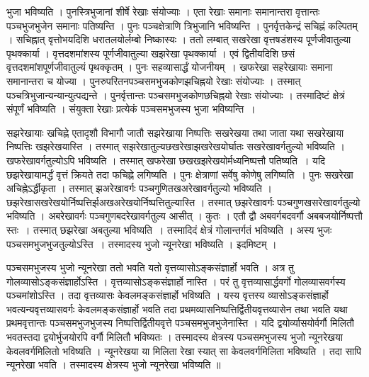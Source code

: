 \documentclass[11pt, openany]{book}
\begin{document}
\newpage
\noindent भुजा भविष्यति । पुनस्त्रिभुजानां शीर्षे रेखाः संयोज्याः । एता रेखाः समानाः समानान्तरा वृत्तान्तः पञ्चभुजभुजेन समानाः पतिष्यन्ति । पुनः पञ्चक्षेत्राणि त्रिभुजानि भविष्यन्ति । पुनर्वृत्तकेन्द्रं सचिह्नं कल्पितम् । सचिह्नात् वृत्तोभयदिशि धरातलयोर्लम्बो निष्कास्यः । ततो लम्बात् सखरेखा वृत्तषडंशस्य पूर्णजीवातुल्या पृथक्कार्या । वृत्तदशमांशस्य पूर्णजीवातुल्या खझरेखा पृथक्कार्या । एवं द्वितीयदिशि छसं वृत्तदशमांशपूर्णजीवातुल्यं पृथक्कृतम् । पुनः सहव्यासार्द्धं योजनीयम्~। खफरेखा सहरेखायाः समाना समानान्तरा च योज्या । पुनरुपरितनपञ्चसमभुजकोणझचिह्नयो रेखाः संयोज्याः । तस्मात् पञ्चत्रिभुजान्यन्यान्युत्पद्यन्ते । पुनर्वृत्तान्तः पञ्चसमभुजकोणछचिह्नयो रेखाः संयोज्याः । तस्मादिष्टं क्षेत्रं संपूर्णं भविष्यति । संयुक्ता
रेखाः प्रत्येकं पञ्चसमभुजस्य भुजा भविष्यन्ति~।\\
\vspace{10mm}


सझरेखायाः खचिह्ने एतादृशौ विभागौ जातौ सझरेखाया निष्पत्तिः सखरेखया तथा जाता यथा सखरेखाया निष्पत्तिः खझरेखयास्ति । तस्मात् सझरेखातुल्यछखरेखाझखरेखयोर्घातः सखरेखावर्गतुल्यो भविष्यति । खफरेखावर्गतुल्योऽपि भविष्यति । तस्मात् खफरेखा छखखझरेखयोर्मध्यनिष्पत्तौ पतिष्यति~। यदि छझरेखायामर्द्धं वृत्तं क्रियते तदा फचिह्ने लगिष्यति । पुनः क्षेत्राणां सर्वेषु कोणेषु लगिष्यति~। पुनः सखरेखा अचिह्नेऽर्द्धीकृता । तस्मात् झअरेखावर्गः पञ्चगुणितखअरेखावर्गतुल्यो भविष्यति । छझरेखासखरेखयोर्निष्पत्तिर्झअखअरेखयोर्निष्पत्तितुल्यास्ति । तस्मात् छझरेखावर्गः पञ्चगुणखसरेखावर्गतुल्यो भविष्यति । अबरेखावर्गः पञ्चगुणबदरेखावर्गतुल्य आसीत् । कुतः । एतौ द्वौ अबवर्गबदवर्गौ अबबजयोर्निष्पत्तौ स्तः~। तस्मात् छझरेखा अबतुल्या भविष्यति~। तस्मादिदं क्षेत्रं गोलान्तर्गतं भविष्यति । अस्य भुजः पञ्चसमभुजभुजतुल्योऽस्ति~। तस्मादस्य भुजो न्यूनरेखा भविष्यति । इदमिष्टम् ।

\newpage

पञ्चसमभुजस्य भुजो न्यूनरेखा ततो भवति यतो वृत्तव्यासोऽङ्कसंज्ञार्हो भवति । अत्र तु गोलव्यासोऽङ्कसंज्ञार्होऽस्ति । वृत्तव्यासोऽङ्कसंज्ञार्हो नास्ति । परं तु वृत्तव्यासार्द्धवर्गो गोलव्यासवर्गस्य पञ्चमांशोऽस्ति । तदा वृत्तव्यासः केवलमङ्कसंज्ञार्हो भविष्यति । यस्य वृत्तस्य व्यासोऽङ्कसंज्ञार्हो भवत्यन्यवृत्तव्यासवर्गः केवलमङ्कसंज्ञार्हो भवति तदा
प्रथमव्यासनिष्पत्तिर्द्वितीयवृत्तव्यासेन तथा भवति यथा प्रथमवृत्तान्तः पञ्चसमभुजभुजस्य निष्पत्तिर्द्वितीयवृत्ते पञ्चसमभुजभुजेनास्ति । यदि द्वयोर्व्यासयोर्वर्गौ मिलितौ भवतस्तदा द्वयोर्भुजयोरपि वर्गौ मिलितौ भविष्यतः । तस्मादस्य क्षेत्रस्य पञ्चसमभुजस्य भुजो न्यूनरेखया केवलवर्गमिलितो भविष्यति । न्यूनरेखया या मिलिता रेखा स्यात् सा केवलवर्गमिलिता भविष्यति । तदा सापि न्यूनरेखा भवति । तस्मादस्य क्षेत्रस्य भुजो न्यूनरेखा भविष्यति ॥\\
\vspace{5mm}
\end{document}
